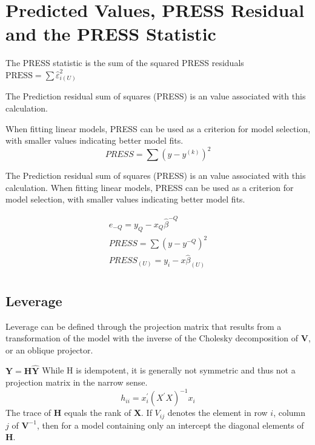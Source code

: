 \documentclass[12pt, a4paper]{report}
\theoremstyle{plain}
\theoremstyle{definition}
\theoremstyle{remark}
\begin{document}
\section{Predicted Values, PRESS Residual and the PRESS Statistic}

The PRESS statistic is the sum of the squared PRESS residuals
$\mbox{PRESS} = \sum \hat{\varepsilon}^2_{i(U)}$



The Prediction residual sum of squares (PRESS) is an value associated with this calculation.

When fitting linear models, PRESS can be used as a criterion for model selection, with smaller values indicating better model fits.
\begin{equation}
PRESS = \sum(y-y^{(k)})^2
\end{equation}

The Prediction residual sum of squares (PRESS) is an value associated with this calculation. When fitting linear models, PRESS can be used as a criterion for model selection, with smaller values indicating better model fits.

\begin{eqnarray*}
	e_{-Q} = y_{Q} - x_{Q}\hat{\beta}^{-Q}\\
	PRESS = \sum(y-y^{-Q})^2\\
	PRESS_{(U)} = y_{i} - x\hat{\beta}_{(U)}\\
\end{eqnarray*}
\subsection{Leverage}

Leverage can be defined through the projection matrix that results from a transformation of the model with the inverse of the Cholesky decomposition of $\boldsymbol{V}$, or an oblique projector.

$\boldsymbol{Y} = \boldsymbol{H}\boldsymbol{\hat{Y}}$
While H is idempotent, it is generally not symmetric and thus not a projection matrix in the narrow sense.
\[ h_{ii} = x^{\prime}_{i}(X^{\prime}X)^{-1}x_{i} \]
The trace of $\boldsymbol{H}$ equals the rank of $\boldsymbol{X}$.
If $V_{ij}$ denotes the element in row $i$, column $j$ of $\boldsymbol{V}^{-1}$, then for a model containing only an intercept the diagonal elements of $\boldsymbol{H}$.
\end{document}
